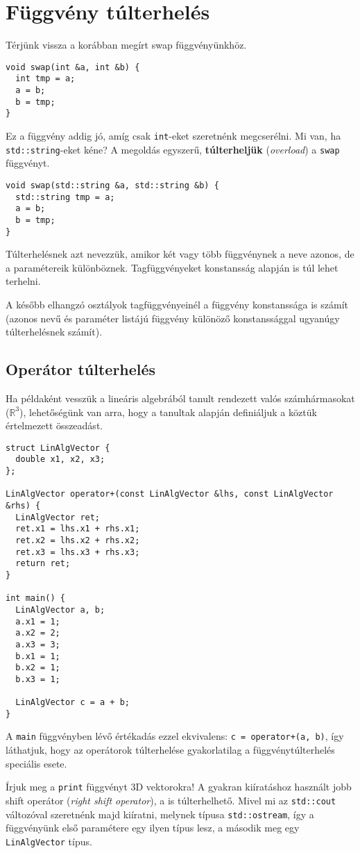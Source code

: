\documentclass[../cpp_book/cpp_book.tex]{subfiles}
\begin{document}
	\section{Függvény túlterhelés}
	Térjünk vissza a korábban megírt swap függvényünkhöz.
	\begin{lstlisting}
void swap(int &a, int &b) {
  int tmp = a;
  a = b;
  b = tmp;
}
	\end{lstlisting}
	Ez a függvény addig jó, amíg csak \texttt{int}-eket szeretnénk megcserélni. Mi van, ha \texttt{std::string}-eket kéne? A megoldás egyszerű, \textbf{túlterheljük} (\textit{overload}) a \texttt{swap} függvényt.
	\begin{lstlisting}
void swap(std::string &a, std::string &b) {
  std::string tmp = a;
  a = b;
  b = tmp;
}
	\end{lstlisting}
	Túlterhelésnek azt nevezzük, amikor két vagy több függvénynek a neve azonos, de a paramétereik különböznek. Tagfüggvényeket konstansság alapján is túl lehet terhelni.
	\begin{note}
		A később elhangzó osztályok tagfüggvényeinél a függvény konstanssága is számít (azonos nevű és paraméter listájú függvény különöző konstanssággal ugyanúgy túlterhelésnek számít).
	\end{note}
	\subsection{Operátor túlterhelés}
	Ha példaként vesszük a lineáris algebrából tanult rendezett valós számhármasokat ($\mathbb{R}^3$), lehetőségünk van arra, hogy a tanultak alapján definiáljuk a köztük értelmezett összeadást.
	\begin{lstlisting}
struct LinAlgVector {
  double x1, x2, x3;
};

LinAlgVector operator+(const LinAlgVector &lhs, const LinAlgVector &rhs) {
  LinAlgVector ret;
  ret.x1 = lhs.x1 + rhs.x1;
  ret.x2 = lhs.x2 + rhs.x2;
  ret.x3 = lhs.x3 + rhs.x3;
  return ret;
}

int main() {
  LinAlgVector a, b;
  a.x1 = 1;
  a.x2 = 2;
  a.x3 = 3;
  b.x1 = 1;
  b.x2 = 1;
  b.x3 = 1;

  LinAlgVector c = a + b;
}
	\end{lstlisting}
	A \texttt{main} függvényben lévő értékadás ezzel ekvivalens: \texttt{c = operator+(a, b)}, így láthatjuk, hogy az operátorok túlterhelése gyakorlatilag a függvénytúlterhelés speciális esete. 
	\smallskip 
	
	Írjuk meg a \texttt{print} függvényt 3D vektorokra! A gyakran kiíratáshoz használt jobb shift operátor (\textit{right shift operator}), a \texttt{\<} is túlterhelhető. Mivel mi az \texttt{std::cout} változóval szeretnénk majd kiíratni, melynek típusa \texttt{std::ostream}, így a függvényünk első paramétere egy ilyen típus lesz, a második meg egy \texttt{LinAlgVector} típus.
	
\end{document}
